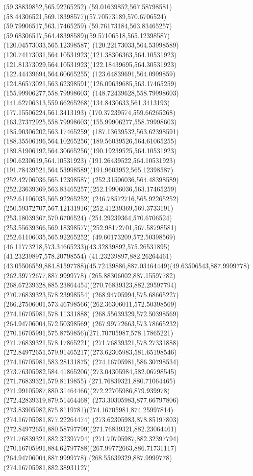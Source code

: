 {{\lineto(59.38839852,565.92265252)
\curveto(59.01639852,567.58798581)(58.44306521,569.18398577)(57.70573189,570.6706524)
\moveto(59.79906517,563.17465259)
\curveto(59.76173184,563.83465257)(59.68306517,564.48398589)(59.57106518,565.12398587)
\lineto(120.04573033,565.12398587)
\curveto(120.22173033,564.53998589)(120.74173031,564.10531923)(121.38306363,564.10531923)
\curveto(121.81373029,564.10531923)(122.18439695,564.30531923)(122.44439694,564.60665255)
\curveto(123.64839691,564.0999859)(124.86573021,563.62398591)(126.09639685,563.17465259)
\closepath
\moveto(155.99906277,558.79998603)
\curveto(148.72439628,558.79998603)(141.62706313,559.66265268)(134.8430633,561.3413193)
\lineto(177.15506224,561.3413193)
\curveto(170.37239574,559.66265268)(163.27372925,558.79998603)(155.99906277,558.79998603)
\moveto(185.90306202,563.17465259)
\curveto(187.13639532,563.62398591)(188.35506196,564.10265256)(189.56039526,564.61065255)
\curveto(189.81906192,564.30665256)(190.19239525,564.10531923)(190.6230619,564.10531923)
\curveto(191.26439522,564.10531923)(191.78439521,564.53998589)(191.9603952,565.12398587)
\lineto(252.42706036,565.12398587)
\curveto(252.31506036,564.48398589)(252.23639369,563.83465257)(252.19906036,563.17465259)
\closepath
\moveto(252.61106035,565.92265252)
\lineto(246.78572716,565.92265252)
\curveto(250.59372707,567.12131916)(252.41239369,569.3733191)(253.18039367,570.6706524)
\lineto(254.29239364,570.6706524)
\curveto(253.55639366,569.18398577)(252.98172701,567.58798581)(252.61106035,565.92265252)
\moveto(49.60173209,572.50398569)
\curveto(46.11773218,573.34665233)(43.32839892,575.26531895)(41.23239897,578.20798554)
\lineto(41.23239897,882.26264461)
\curveto(43.05506559,884.81597788)(45.72439886,887.03464449)(49.63506543,887.9999778)
\lineto(262.39772677,887.9999778)
\curveto(265.88306002,887.15597782)(268.67239328,885.23864454)(270.76839323,882.29597794)
\lineto(270.76839323,578.23998554)
\curveto(268.94705994,575.68665227)(266.27506001,573.46798566)(262.36306011,572.50398569)
\closepath
\moveto(274.16705981,578.11331888)
\lineto(268.55639329,572.50398569)
\lineto(264.94706004,572.50398569)
\curveto(267.99772663,573.78665232)(270.16705991,575.8759856)(271.70705987,578.17865221)
\lineto(271.76839321,578.17865221)
\lineto(271.76839321,578.27331888)
\curveto(272.84972651,579.91465217)(273.62305983,581.65198546)(274.16705981,583.28131875)
\closepath
\moveto(274.16705981,586.30798534)
\curveto(273.76305982,584.41865206)(273.04305984,582.06798545)(271.76839321,579.8119855)
\lineto(271.76839321,880.71064465)
\curveto(271.99105987,880.31464466)(272.22705986,879.939978)(272.42839319,879.51464468)
\curveto(273.30305983,877.66797806)(273.83905982,875.8119781)(274.16705981,874.25997814)
\closepath
\moveto(274.16705981,877.22264474)
\curveto(273.62305983,878.85197803)(272.84972651,880.58797799)(271.76839321,882.23064461)
\lineto(271.76839321,882.32397794)
\lineto(271.70705987,882.32397794)
\curveto(270.16705991,884.62797788)(267.99772663,886.71731117)(264.94706004,887.9999778)
\lineto(268.55639329,887.9999778)
\lineto(274.16705981,882.38931127)
\closepath
}
}
